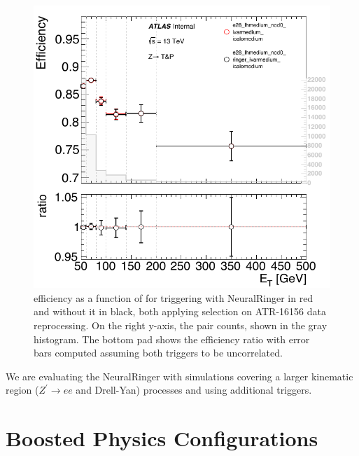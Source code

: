 \begin{figure}[htb]
  \centering
  \includegraphics[width=.5\textwidth]{sections/other_studies/figures/high_et_e28_lhmedium_nod0}
  \caption{\Zee{} \tnp{} efficiency as a function of \et{} for triggering with
  NeuralRinger in red and without it in black, both applying \medium{} selection
on ATR-16156 data reprocessing. On the right y-axis, the \tnp{} pair counts,
shown in the gray histogram. The bottom pad shows the efficiency ratio with
error bars computed assuming both triggers to be
uncorrelated.\label{fig:high_et_eff}}
\end{figure}





We are evaluating the NeuralRinger with simulations covering a larger kinematic region
($Z^{'}\rightarrow ee$ and Drell-Yan) processes and using additional triggers.

\section{Boosted Physics Configurations}\label{ssec:boosted_topology}




